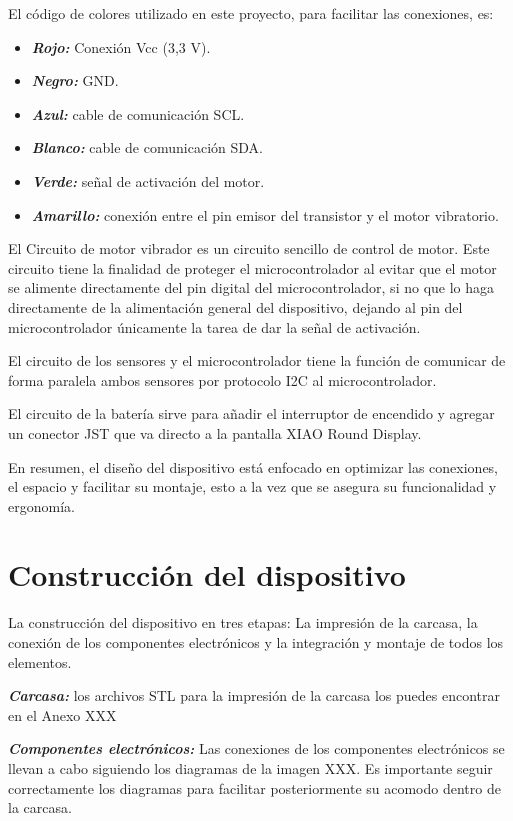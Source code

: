 \documentclass[
  letterpaper,
  DIV=11,
  numbers=noendperiod]{scrreport}
\providecommand{\tightlist}{%
  \setlength{\itemsep}{0pt}\setlength{\parskip}{0pt}}\usepackage{longtable,booktabs,array}
\begin{document}
El código de colores utilizado en este proyecto, para facilitar las
conexiones, es:

\begin{itemize}
\tightlist
\item
  \textbf{\emph{Rojo:}} Conexión Vcc (3,3 V).
\item
  \textbf{\emph{Negro:}} GND.
\item
  \textbf{\emph{Azul:}} cable de comunicación SCL.
\item
  \textbf{\emph{Blanco:}} cable de comunicación SDA.
\item
  \textbf{\emph{Verde:}} señal de activación del motor.
\item
  \textbf{\emph{Amarillo:}} conexión entre el pin emisor del transistor
  y el motor vibratorio.
\end{itemize}

El Circuito de motor vibrador es un circuito sencillo de control de
motor. Este circuito tiene la finalidad de proteger el microcontrolador
al evitar que el motor se alimente directamente del pin digital del
microcontrolador, si no que lo haga directamente de la alimentación
general del dispositivo, dejando al pin del microcontrolador únicamente
la tarea de dar la señal de activación.

El circuito de los sensores y el microcontrolador tiene la función de
comunicar de forma paralela ambos sensores por protocolo I2C al
microcontrolador.

El circuito de la batería sirve para añadir el interruptor de encendido
y agregar un conector JST que va directo a la pantalla XIAO Round
Display.

En resumen, el diseño del dispositivo está enfocado en optimizar las
conexiones, el espacio y facilitar su montaje, esto a la vez que se
asegura su funcionalidad y ergonomía.

\section{Construcción del
dispositivo}\label{construcciuxf3n-del-dispositivo}

La construcción del dispositivo en tres etapas: La impresión de la
carcasa, la conexión de los componentes electrónicos y la integración y
montaje de todos los elementos.

\textbf{\emph{Carcasa:}} los archivos STL para la impresión de la
carcasa los puedes encontrar en el Anexo XXX

\textbf{\emph{Componentes electrónicos:}} Las conexiones de los
componentes electrónicos se llevan a cabo siguiendo los diagramas de la
imagen XXX. Es importante seguir correctamente los diagramas para
facilitar posteriormente su acomodo dentro de la carcasa.
\end{document}
